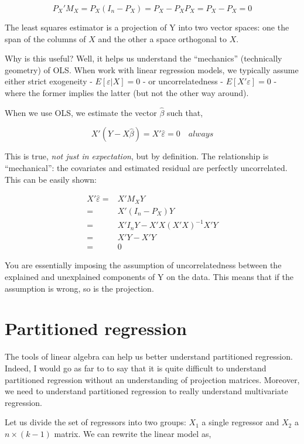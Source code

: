 \documentclass[
  letterpaper,
  DIV=11,
  numbers=noendperiod]{scrreprt}
\begin{document}
\[
P_X'M_X = P_X(I_n-P_X) = P_X-P_XP_X = P_X-P_X = 0
\]

The least squares estimator is a projection of Y into two vector spaces:
one the span of the columns of \(X\) and the other a space orthogonal to
\(X\).

Why is this useful? Well, it helps us understand the ``mechanics''
(technically geometry) of OLS. When work with linear regression models,
we typically assume either strict exogeneity - \(E[\varepsilon|X]=0\) -
or uncorrelatedness - \(E[X'\varepsilon]=0\) - where the former implies
the latter (but not the other way around).

When we use OLS, we estimate the vector \(\hat{\beta}\) such that,

\[
X'(Y-X\hat{\beta})=X'\hat{\varepsilon}=0 \quad always
\]

This is true, \emph{not just in expectation}, but by definition. The
relationship is ``mechanical'': the covariates and estimated residual
are perfectly uncorrelated. This can be easily shown:

\[
\begin{align}
X'\hat{\varepsilon} =& X'M_XY \\
=& X'(I_n-P_X)Y \\
=&X'I_nY-X'X(X'X)^{-1}X'Y \\
=&X'Y-X'Y \\
=&0
\end{align}
\]

You are essentially imposing the assumption of uncorrelatedness between
the explained and unexplained components of Y on the data. This means
that if the assumption is wrong, so is the projection.

\hypertarget{partitioned-regression}{%
\section{Partitioned regression}\label{partitioned-regression}}

The tools of linear algebra can help us better understand partitioned
regression. Indeed, I would go as far to to say that it is quite
difficult to understand partitioned regression without an understanding
of projection matrices. Moreover, we need to understand partitioned
regression to really understand multivariate regression.

Let us divide the set of regressors into two groups: \(X_1\) a single
regressor and \(X_2\) a \(n\times (k-1)\) matrix. We can rewrite the
linear model as,
\end{document}
